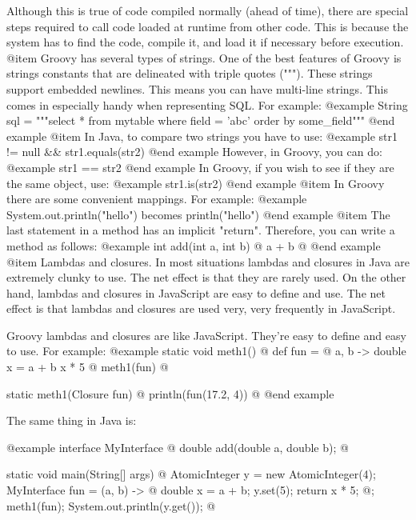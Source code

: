 Although this is true of code compiled normally (ahead of time),
there are special steps required to call code loaded at runtime
from other code.  This is because the system has to find the code,
compile it, and load it if necessary before execution.
@item
Groovy has several types of strings.  One of the best features of
Groovy is strings constants that are delineated with triple quotes
(""").  These strings support embedded newlines.  This means you
can have multi-line strings.  This comes in especially handy when
representing SQL.  For example:
@example
       String sql = """select *
                       from mytable
                       where field = 'abc'
                       order by some_field"""
@end example
@item
In Java, to compare two strings you have to use:
@example
      str1 != null && str1.equals(str2)
@end example
   However, in Groovy, you can do:
@example
      str1 == str2
@end example
In Groovy, if you wish to see if they are the same object, use:
@example   
      str1.is(str2)
@end example
@item
In Groovy there are some convenient mappings.  For example:
@example
   System.out.println("hello") becomes println("hello")
@end example
@item
The last statement in a method has an implicit "return".  Therefore,
you can write a method as follows:
@example   
   int add(int a, int b) @{
       a + b
   @}
@end example
@item
Lambdas and closures.  In most situations lambdas and closures in
Java are extremely clunky to use.  The net effect is that they are
rarely used.  On the other hand, lambdas and closures in JavaScript
are easy to define and use.  The net effect is that lambdas and
closures are used very, very frequently in JavaScript.
   
Groovy lambdas and closures are like JavaScript.  They're easy to
define and easy to use.  For example:
@example   
       static void meth1() @{
            def fun = @{ a, b ->
                double x = a + b
                x * 5
            @}
            meth1(fun)
        @}

        static meth1(Closure fun) @{
            println(fun(17.2, 4))
        @}
@end example

The same thing in Java is:

@example
        interface MyInterface @{
            double add(double a, double b);
        @}

        static void main(String[] args) @{
            AtomicInteger y = new AtomicInteger(4);
            MyInterface fun = (a, b) -> @{
                double x = a + b;
                y.set(5);
                return x * 5;
            @};
            meth1(fun);
            System.out.println(y.get());
        @}

